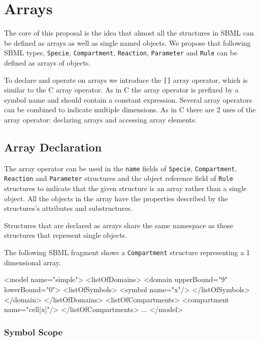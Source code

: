 \documentclass{cekarticle}
\begin{document}
\section{Arrays}
\label{sec:arrays}

The core of this proposal is the idea that almost all the
structures in SBML can be defined as arrays as well as single
named objects.  We propose that following SBML types,
\texttt{Specie}, \texttt{Compartment}, \texttt{Reaction},
\texttt{Parameter} and \texttt{Rule} can be defined as arrays of
objects.

To declare and operate on arrays we introduce the \texttt{[]}
array operator, which is similar to the C array operator.  As in
C the array operator is prefixed by a symbol name and should
contain a constant expression.  Several array operators can be
combined to indicate multiple dimensions.   As in C there are 2
uses of the array operator: declaring arrays and accessing array
elements.

\subsection{Array Declaration}

The array operator can be used in the \texttt{name} fields of
\texttt{Specie}, \texttt{Compartment}, \texttt{Reaction} and
\texttt{Parameter} structures and the object reference field of
\texttt{Rule} structures to indicate that the given structure is
an array rather than a single object. All the objects in the
array have the properties described by the structures's
attributes and substructures.

Structures that are declared as arrays share the same namespace
as those structures that represent single objects.

The following SBML fragment shows a \texttt{Compartment}
structure representing a 1 dimensional array.

\begin{example}
<model name="simple">
    <listOfDomains>
        <domain upperBound="9" lowerBound="0">
            <listOfSymbols>
                <symbol name="x"/>
            </listOfSymbols>
        </domain>
    </listOfDomains>
    <listOfCompartments>
        <compartment name="cell[x]"/>
    </listOfCompartments>
    ...
</model>
\end{example}

\subsubsection{Symbol Scope}
\end{document}
